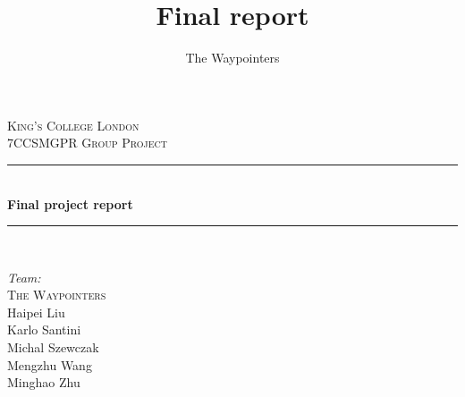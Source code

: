 \documentclass[a4paper,12pt]{article}
\title{Final report}
\author{The Waypointers}
\begin{document}
%
%
%

\begin{titlepage}

\newcommand{\HRule}{\rule{\linewidth}{0.5mm}} %

\center %


\textsc{\LARGE King's College London}\\[1.5cm] %
\textsc{\Large 7CCSMGPR Group Project}\\[0.5cm] %


\HRule \\[0.4cm]
{ \huge \bfseries Final project report}\\[0.4cm] %
\HRule \\[1.5cm]

\begin{flushleft}
{\Large \emph{Team:}\\
\textsc{The Waypointers}\\}
Haipei Liu\\
Karlo Santini\\
Michal Szewczak\\
Mengzhu Wang\\
Minghao Zhu\\[3cm]
\end{flushleft}


\end{titlepage}
\end{document}
